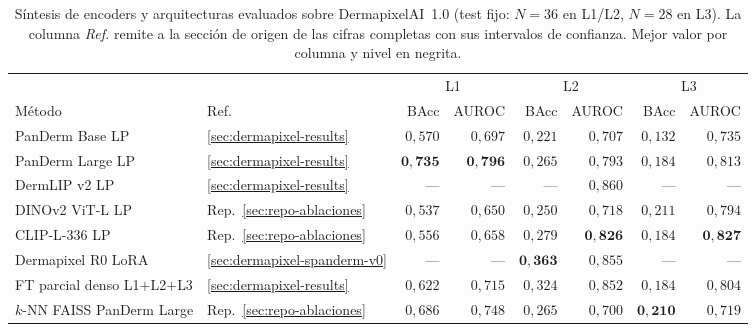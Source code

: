\begin{table}[htbp]
\centering
\footnotesize
\setlength{\tabcolsep}{4pt}
\renewcommand{\arraystretch}{0.95}
\caption{Síntesis de encoders y arquitecturas evaluados sobre
DermapixelAI~1.0 (test fijo: $N = 36$ en L1/L2, $N = 28$ en L3).
La columna \emph{Ref.} remite a la sección de origen de las cifras
completas con sus intervalos de confianza. Mejor valor por columna
y nivel en negrita.}
\label{tab:dermapixel-extra-sintesis}
\begin{tabular}{llrrrrrr}
\hline
                                  &     & \multicolumn{2}{c}{L1} & \multicolumn{2}{c}{L2} & \multicolumn{2}{c}{L3} \\
Método                            & Ref.& BAcc & AUROC           & BAcc & AUROC           & BAcc & AUROC \\
\hline
PanDerm Base LP                   & \ref{sec:dermapixel-results} & $0{,}570$          & $0{,}697$
                                          & $0{,}221$          & $0{,}707$
                                          & $0{,}132$          & $0{,}735$ \\
PanDerm Large LP                  & \ref{sec:dermapixel-results} & $\mathbf{0{,}735}$ & $\mathbf{0{,}796}$
                                          & $0{,}265$          & $0{,}793$
                                          & $0{,}184$          & $0{,}813$ \\
DermLIP v2 LP                     & \ref{sec:dermapixel-results} & ---                & ---
                                          & ---                & $0{,}860$
                                          & ---                & --- \\
DINOv2 ViT-L LP                   & Rep.~\ref{sec:repo-ablaciones} & $0{,}537$          & $0{,}650$
                                          & $0{,}250$          & $0{,}718$
                                          & $0{,}211$          & $0{,}794$ \\
CLIP-L-336 LP                     & Rep.~\ref{sec:repo-ablaciones} & $0{,}556$          & $0{,}658$
                                          & $0{,}279$          & $\mathbf{0{,}826}$
                                          & $0{,}184$          & $\mathbf{0{,}827}$ \\
Dermapixel R0 LoRA                & \ref{sec:dermapixel-spanderm-v0} & ---                & ---
                                          & $\mathbf{0{,}363}$ & $0{,}855$
                                          & ---                & --- \\
FT parcial denso L1$+$L2$+$L3      & \ref{sec:dermapixel-results} & $0{,}622$          & $0{,}715$
                                          & $0{,}324$          & $0{,}852$
                                          & $0{,}184$          & $0{,}804$ \\
$k$-NN FAISS PanDerm Large         & Rep.~\ref{sec:repo-ablaciones} & $0{,}686$          & $0{,}748$
                                          & $0{,}265$          & $0{,}700$
                                          & $\mathbf{0{,}210}$ & $0{,}719$ \\
\hline
\end{tabular}
\end{table}

